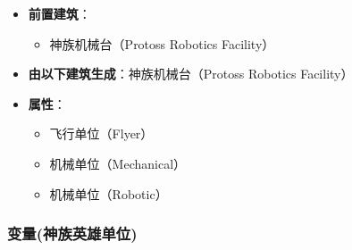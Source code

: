 \begin{tcolorbox}[colback=white, colframe=black!60!white, title=Protoss\_Shuttle(), arc=0mm]
\begin{itemize}
\begin{itemize}
            \end{itemize}
        \item \textbf{前置建筑}：
            \begin{itemize}
                \item 神族机械台（Protoss Robotics Facility）
            \end{itemize}
        \item \textbf{由以下建筑生成}：神族机械台（Protoss Robotics Facility）
        \item \textbf{属性}：
            \begin{itemize}
                \item 飞行单位（Flyer）
                \item 机械单位（Mechanical）
                \item 机械单位（Robotic）
            \end{itemize}
    \end{itemize}
\end{tcolorbox}

\subsubsection{变量(神族英雄单位)}

